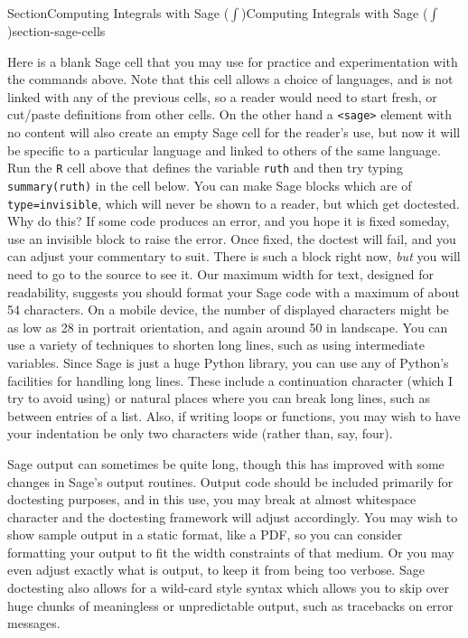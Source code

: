 \documentclass[twoside,10pt,]{article}
\newcommand{\mono}[1]{\texttt{#1}}
\numberwithin{equation}{section}
\begin{document}
\begin{sectionptx}{Section}{Computing Integrals with Sage (\(\int\))}{}{Computing Integrals with Sage (\(\int\))}{}{}{section-sage-cells}
Here is a blank Sage cell that you may use for practice and experimentation with the commands above.  Note that this cell allows a choice of languages, and is not linked with any of the previous cells, so a reader would need to start fresh, or cut\slash{}paste definitions from other cells.%
On the other hand a \mono{<sage>} element with no content will also create an empty Sage cell for the reader's use, but now it will be specific to a particular language and linked to others of the same language.  Run the \mono{R} cell above that defines the variable \mono{ruth} and then try typing \mono{summary(ruth)} in the cell below.%
You can make Sage blocks which are of \mono{type=\textquotedbl{}invisible\textquotedbl{}}, which will never be shown to a reader, but which get doctested.  Why do this?  If some code produces an error, and you hope it is fixed someday, use an invisible block to raise the error.  Once fixed, the doctest will fail, and you can adjust your commentary to suit.  There is such a block right now, \emph{but} you will need to go to the source to see it.%
Our maximum width for text, designed for readability, suggests you should format your Sage code with a maximum of about 54 characters. On a mobile device, the number of displayed characters might be as low as 28 in portrait orientation, and again around 50 in landscape.  You can use a variety of techniques to shorten long lines, such as using intermediate variables.  Since Sage is just a huge Python library, you can use any of Python's facilities for handling long lines.  These include a continuation character (which I try to avoid using) or natural places where you can break long lines, such as between entries of a list.  Also, if writing loops or functions, you may wish to have your indentation be only two characters wide (rather than, say, four).%
\par
Sage output can sometimes be quite long, though this has improved with some changes in Sage's output routines.  Output code should be included primarily for doctesting purposes, and in this use, you may break at almost whitespace character and the doctesting framework will adjust accordingly.  You may wish to show sample output in a static format, like a PDF, so you can consider formatting your output to fit the width constraints of that medium.  Or you may even adjust exactly what is output, to keep it from being too verbose.  Sage doctesting also allows for a wild-card style syntax which allows you to skip over huge chunks of meaningless or unpredictable output, such as tracebacks on error messages.%

\end{sectionptx}
\end{document}
